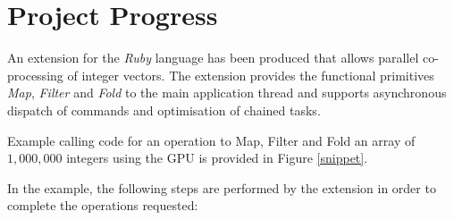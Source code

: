 \section{Project Progress}
  An extension for the \emph{Ruby} language has been produced that allows parallel co-processing of integer vectors. The extension provides the functional primitives \emph{Map}, \emph{Filter} and \emph{Fold} to the main application thread and supports asynchronous dispatch of commands and optimisation of chained tasks.

  Example calling code for an operation to Map, Filter and Fold an array of $1,000,000$ integers using the GPU is provided in Figure \ref{snippet}.


  In the example, the following steps are performed by the extension in order to complete the operations requested:

